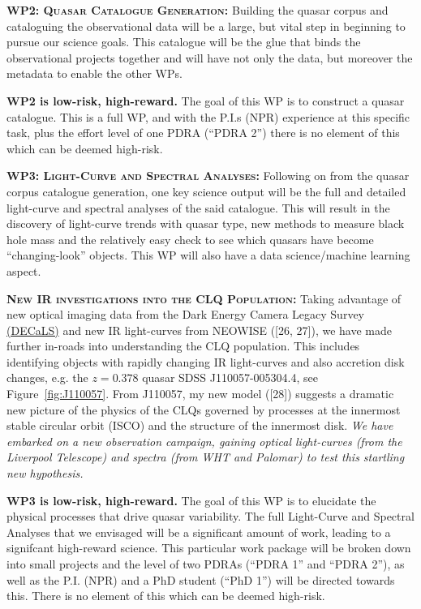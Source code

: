 \smallskip
\smallskip
\noindent
\textbf{\textsc{WP2: Quasar Catalogue Generation:}} 
Building the quasar corpus and cataloguing the observational data will
be a large, but vital step in beginning to pursue our science
goals. This catalogue will be the glue that binds the observational
projects together and will have not only the data, but moreover the
metadata to enable the other WPs.

\noindent
{\bf WP2 is low-risk, high-reward.}
The goal of this WP is to construct a quasar catalogue.
This is a full WP, and with the P.I.s (NPR) experience at this
specific task, plus the effort level of one PDRA (``PDRA 2'') there is
no element of this which can be deemed high-risk.


\smallskip
\smallskip
\noindent
\textbf{\textsc{WP3: Light-Curve and Spectral Analyses:}} 
Following on from the quasar corpus catalogue generation, one key
science output will be the full and detailed light-curve and spectral
analyses of the said catalogue. This will result in the discovery of
light-curve trends with quasar type, new methods to measure black hole
mass and the relatively easy check to see which quasars have become
``changing-look'' objects. This WP will also have a data science/machine learning 
aspect.

\smallskip
\smallskip
\noindent
\textbf{\textsc{New IR investigations into the CLQ Population:}}
Taking advantage of new optical imaging data from the Dark Energy
Camera Legacy Survey \href{http://legacysurvey.org/decamls/}{(DECaLS)}
and new IR light-curves from NEOWISE ([26, 27]), we have made further
in-roads into understanding the CLQ population. This includes
identifying objects with rapidly changing IR light-curves and also
accretion disk changes, e.g. the $z=0.378$ quasar SDSS
J110057-005304.4, see Figure~\ref{fig:J110057}. From J110057, my new
model ([28]) suggests a dramatic new picture of the physics of the
CLQs governed by processes at the innermost stable circular orbit
(ISCO) and the structure of the innermost disk. {\it We have embarked
on a new observation campaign, gaining optical light-curves (from the
Liverpool Telescope) and spectra (from WHT and Palomar) to test this
startling new hypothesis.}


\noindent
{\bf WP3 is low-risk, high-reward.} 
The goal of this WP is to elucidate the physical processes that drive quasar variability.
The full Light-Curve and Spectral
Analyses that we envisaged will be a significant amount of work,
leading to a signifcant high-reward science. This particular work
package will be broken down into small projects and the level of two
PDRAs (``PDRA 1'' and ``PDRA 2''), as well as the P.I. (NPR) and a PhD
student (``PhD 1'') will be directed towards this. There is no element
of this which can be deemed high-risk.


